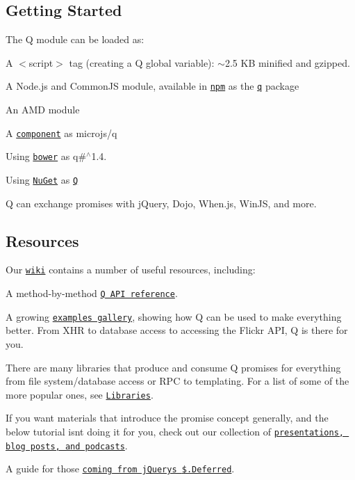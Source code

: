 \subsection*{Getting Started}

The Q module can be loaded as\+:


\begin{DoxyItemize}
\item A {\ttfamily $<$script$>$} tag (creating a {\ttfamily Q} global variable)\+: $\sim$2.5 KB minified and gzipped.
\item A Node.\+js and Common\+JS module, available in \href{https://npmjs.org/}{\tt npm} as the \href{https://npmjs.org/package/q}{\tt q} package
\item An A\+MD module
\item A \href{https://github.com/component/component}{\tt component} as {\ttfamily microjs/q}
\item Using \href{http://bower.io/}{\tt bower} as {\ttfamily q\#$^\wedge$1.4.}
\item Using \href{http://nuget.org/}{\tt Nu\+Get} as \href{https://nuget.org/packages/q}{\tt Q}
\end{DoxyItemize}

Q can exchange promises with j\+Query, Dojo, When.\+js, Win\+JS, and more.

\subsection*{Resources}

Our \href{https://github.com/kriskowal/q/wiki}{\tt wiki} contains a number of useful resources, including\+:


\begin{DoxyItemize}
\item A method-\/by-\/method \href{https://github.com/kriskowal/q/wiki/API-Reference}{\tt Q A\+PI reference}.
\item A growing \href{https://github.com/kriskowal/q/wiki/Examples-Gallery}{\tt examples gallery}, showing how Q can be used to make everything better. From X\+HR to database access to accessing the Flickr A\+PI, Q is there for you.
\item There are many libraries that produce and consume Q promises for everything from file system/database access or R\+PC to templating. For a list of some of the more popular ones, see \href{https://github.com/kriskowal/q/wiki/Libraries}{\tt Libraries}.
\item If you want materials that introduce the promise concept generally, and the below tutorial isn\textquotesingle{}t doing it for you, check out our collection of \href{https://github.com/kriskowal/q/wiki/General-Promise-Resources}{\tt presentations, blog posts, and podcasts}.
\item A guide for those \href{https://github.com/kriskowal/q/wiki/Coming-from-jQuery}{\tt coming from j\+Query\textquotesingle{}s {\ttfamily \$.Deferred}}.
\end{DoxyItemize}

